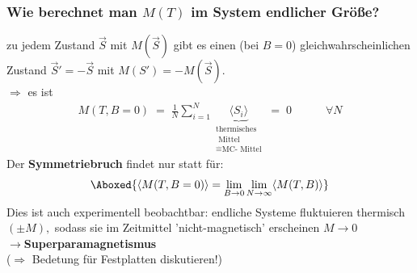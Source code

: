 \documentclass[12pt]{article}
\begin{document}
 \subsubsection*{Wie berechnet man $M(T)$ im System endlicher Größe?}
zu jedem Zustand $\vec{S}$ mit $M(\vec{S})$ gibt es einen (bei $ B=0$) gleichwahrscheinlichen Zustand $\vec{S}'= -\vec{S}$ mit $M(S') = - M(\vec{S})$. \\
$\Rightarrow$ es ist 
\begin{align*}
M(T,B=0) \; = \;  \frac{1}{N} \sum_{i=1}^N \underbrace{\langle S_i \rangle}_{\substack{ \text{thermisches} \\ \text{ Mittel} \\ \widehat{=} \text{MC- Mittel}}} \; = \; 0 \quad \quad \quad \forall N
\end{align*} 
Der \textbf{Symmetriebruch} findet nur statt für: 
\begin{align}
\Aboxed{\langle M(T,B=0) \rangle = \lim_{B \to 0} \lim_{N \to \infty} \langle M(T,B) \rangle }
\end{align} 
Dies ist auch experimentell beobachtbar: endliche Systeme fluktuieren thermisch $(\pm M),$ sodass sie im Zeitmittel 'nicht-magnetisch' erscheinen $M \to 0$ \\
$\to$\textbf{Superparamagnetismus} \\ ($\Rightarrow$ Bedetung für Festplatten diskutieren!) \\
\end{document}
